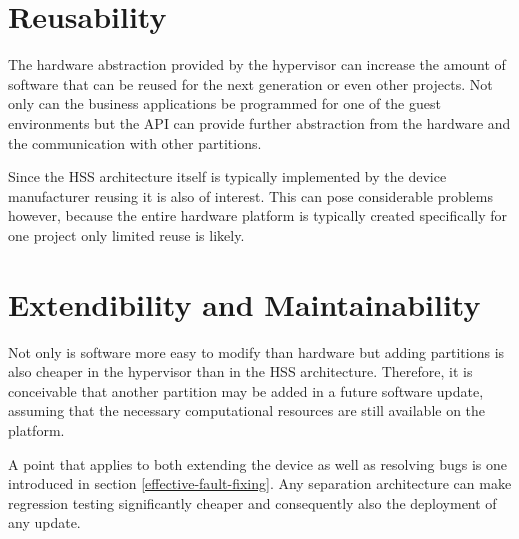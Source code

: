 
\section{Reusability}
The hardware abstraction provided by the hypervisor can increase the amount of software that can be reused for the next generation or even other projects. Not only can the business applications be programmed for one of the guest environments but the \gls{API} can provide further abstraction from the hardware and the communication with other partitions.

Since the \gls{HSS} architecture itself is typically implemented by the device manufacturer reusing it is also of interest. This can pose considerable problems however, because the entire hardware platform is typically created specifically for one project only limited reuse is likely.


\section{Extendibility and Maintainability}
Not only is software more easy to modify than hardware but adding partitions is also cheaper in the hypervisor than in the \gls{HSS} architecture. Therefore, it is conceivable that another partition may be added in a future software update, assuming that the necessary computational resources are still available on the platform. 

A point that applies to both extending the device as well as resolving bugs is one introduced in section \ref{effective-fault-fixing}. Any separation architecture can make regression testing significantly cheaper and consequently also the deployment of any update. 


